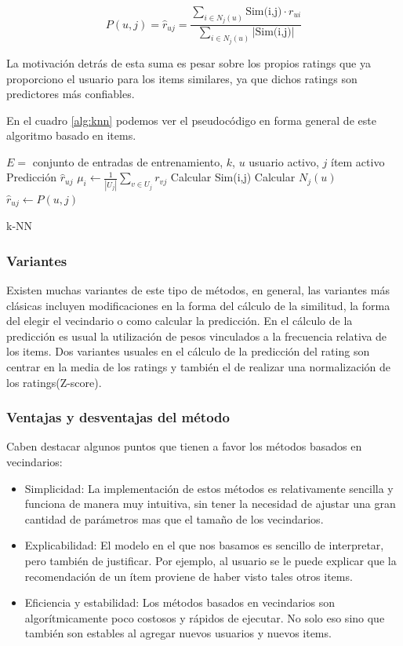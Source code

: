 \documentclass[hidelinks,12pt,a4paper]{book}
\theoremstyle{plain}
\theoremstyle{definition}
\begin{document}
\begin{equation}
P(u,j) = \hat{r}_{uj}=\frac{\sum_{i \in N_j(u)}\text{Sim(i,j)} \cdot r_{ui}}{\sum_{i \in N_j(u)}|\text{Sim(i,j)}|}
\end{equation}

La motivación detrás de esta suma es pesar sobre los propios ratings que ya proporciono el usuario para los items similares, ya que dichos ratings son predictores más confiables.

En el cuadro \ref{alg:knn} podemos ver el pseudocódigo en forma general de este algoritmo basado en items.

\begin{algorithm}[H]
\begin{algorithmic}[KNN]
\REQUIRE $E=$ conjunto de entradas de entrenamiento, $k$, $u$ usuario activo, $j$ ítem activo 
\ENSURE Predicción $\hat{r}_{uj}$
\STATE $\mu_i \leftarrow \frac{1}{|U_j|} \sum_{v \in U_j} r_{vj}$
\STATE Calcular Sim(i,j)
\ENDFOR
\STATE Calcular $N_j(u)$
\STATE $\hat{r}_{uj} \leftarrow P(u,j)$
\end{algorithmic}
\caption{k-NN}\label{alg:knn}
\end{algorithm}

\subsubsection{Variantes}

Existen muchas variantes de este tipo de métodos, en general, las variantes más clásicas incluyen modificaciones en la forma del cálculo de la similitud, la forma del elegir el vecindario o como calcular la predicción\cite{sarwar2001item}. En el cálculo de la predicción es usual la utilización de pesos vinculados a la frecuencia relativa de los items. Dos variantes usuales en el cálculo de la predicción del rating son centrar en la media de los ratings y también el de realizar una normalización de los ratings(Z-score)\cite{agg}.

\subsubsection{Ventajas y desventajas del método}

Caben destacar algunos puntos que tienen a favor los métodos basados en vecindarios:

\begin{itemize}
\item Simplicidad: La implementación de estos métodos es relativamente sencilla y funciona de manera muy intuitiva, sin tener la necesidad de ajustar una gran cantidad de parámetros mas que el tamaño de los vecindarios.
\item Explicabilidad: El modelo en el que nos basamos es sencillo de interpretar, pero también de justificar. Por ejemplo, al usuario se le puede explicar que la recomendación de un ítem proviene de haber visto tales otros items.
\item Eficiencia y estabilidad: Los métodos basados en vecindarios son algorítmicamente poco costosos y rápidos de ejecutar. No solo eso sino que también son estables al agregar nuevos usuarios y nuevos items\cite{neighbordsurvey}.
\end{itemize}
\end{document}
